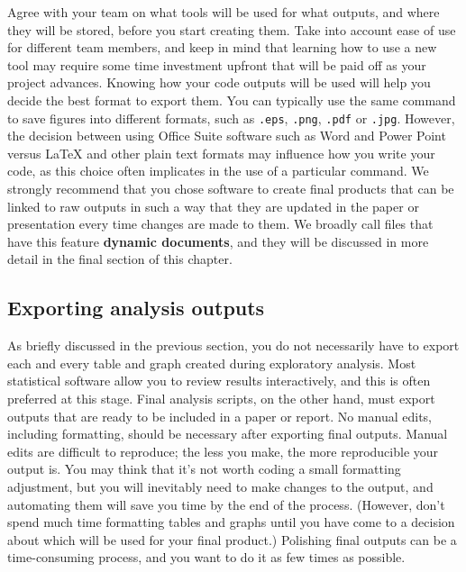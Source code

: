 Agree with your team on what tools will be used for what outputs, 
and where they will be stored, before you start creating them.
Take into account ease of use for different team members, and
keep in mind that learning how to use a new tool may require some
time investment upfront that will be paid off as your project advances.
Knowing how your code outputs will be used will help you decide the best format to export them.
You can typically use the same command to save figures into different formats, 
such as \texttt{.eps}, \texttt{.png}, \texttt{.pdf} or \texttt{.jpg}.
However, the decision between using Office Suite software such as Word and Power Point
versus {\LaTeX} and other plain text formats may influence how you write your code,
as this choice often implicates in the use of a particular command.
We strongly recommend that you chose software to create final products
that can be linked to raw outputs in such a way that they are updated
in the paper or presentation every time changes are made to them.
We broadly call files that have this feature \textbf{dynamic documents},
and they will be discussed in more detail in the final section of this chapter.


\subsection{Exporting analysis outputs}

As briefly discussed in the previous section,
you do not necessarily have to export each and every table and graph created during exploratory analysis.
Most statistical software allow you to review results interactively,
and this is often preferred at this stage.
Final analysis scripts, on the other hand, must export outputs
that are ready to be included in a paper or report.
No manual edits, including formatting, 
should be necessary after exporting final outputs.
Manual edits are difficult to reproduce;
the less you make, the more reproducible your output is.
You may think that it's not worth coding a small formatting adjustment,
but you will inevitably need to make changes to the output,
and automating them will save you time by the end of the process.
(However, don't spend much time formatting tables and graphs until 
you have come to a decision about which will be used for your final product.)
Polishing final outputs can be a time-consuming process,
and you want to do it as few times as possible.

